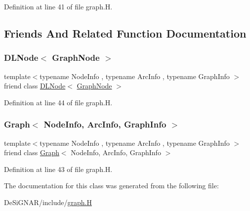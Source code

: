 Definition at line 41 of file graph.\+H.



\subsection{Friends And Related Function Documentation}
\mbox{\label{class_designar_1_1_graph_node_a5d0e7b51039a0eb5cfdfdb2f3701f06d}} 
\subsubsection{\texorpdfstring{D\+L\+Node$<$ Graph\+Node $>$}{DLNode< GraphNode >}}
{\footnotesize\ttfamily template$<$typename Node\+Info , typename Arc\+Info , typename Graph\+Info $>$ \\
friend class \hyperlink{class_designar_1_1_d_l_node}{D\+L\+Node}$<$ \hyperlink{class_designar_1_1_graph_node}{Graph\+Node} $>$\hspace{0.3cm}{\ttfamily [friend]}}



Definition at line 44 of file graph.\+H.

\mbox{\label{class_designar_1_1_graph_node_a0a9834688687d864501bbb9c85b0d32c}} 
\subsubsection{\texorpdfstring{Graph$<$ Node\+Info, Arc\+Info, Graph\+Info $>$}{Graph< NodeInfo, ArcInfo, GraphInfo >}}
{\footnotesize\ttfamily template$<$typename Node\+Info , typename Arc\+Info , typename Graph\+Info $>$ \\
friend class \hyperlink{class_designar_1_1_graph}{Graph}$<$ Node\+Info, Arc\+Info, Graph\+Info $>$\hspace{0.3cm}{\ttfamily [friend]}}



Definition at line 43 of file graph.\+H.



The documentation for this class was generated from the following file\+:\begin{DoxyCompactItemize}
\item 
De\+Si\+G\+N\+A\+R/include/\hyperlink{graph_8_h}{graph.\+H}\end{DoxyCompactItemize}
